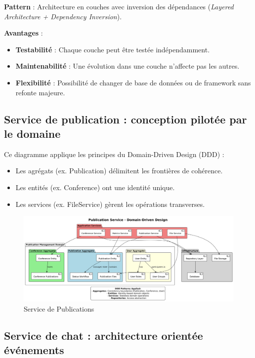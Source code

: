 \documentclass[12pt]{rapportPfe}
\begin{document}
\textbf{Pattern} : Architecture en couches avec inversion des dépendances (\textit{Layered Architecture + Dependency Inversion}).

\textbf{Avantages} :
\begin{itemize}[label=+]
    \item \textbf{Testabilité} : Chaque couche peut être testée indépendamment.
    \item \textbf{Maintenabilité} : Une évolution dans une couche n’affecte pas les autres.
    \item \textbf{Flexibilité} : Possibilité de changer de base de données ou de framework sans refonte majeure.
\end{itemize}


\subsection{Service de publication : conception pilotée par le domaine}
Ce diagramme applique les principes du Domain-Driven Design (DDD) :

\begin{itemize}
    \item Les agrégats (ex. Publication) délimitent les frontières de cohérence.
    \item Les entités (ex. Conference) ont une identité unique.
    \item Les services (ex. FileService) gèrent les opérations transverses.
\end{itemize}

\begin{figure}[htbp]
    \centering
    \includegraphics[width=1.1\textwidth]{diagrams/diagram3.png}
    \caption{Service de Publications }
    \label{fig:diagram3}
\end{figure}

\FloatBarrier
\subsection{Service de chat : architecture orientée événements}
\end{document}
